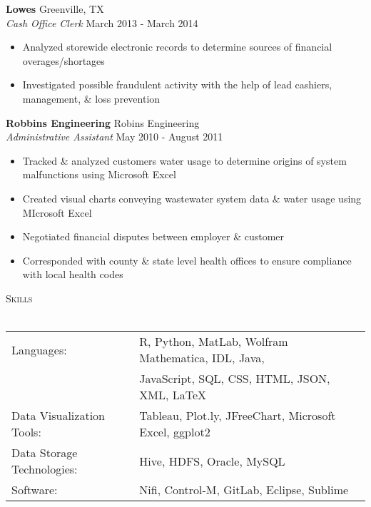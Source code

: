 \documentclass[a4paper]{article}
\newcommand{\lineunder} {
    \vspace*{-8pt} \\
    \hspace*{-18pt} \hrulefill \\
}
\newcommand{\header} [1] {
    {\hspace*{-18pt}\vspace*{6pt} \textsc{#1}}
    \vspace*{-6pt} \lineunder
}
\begin{document}
\newpage
\textbf{Lowe\textquotesingle{}s} \hfill Greenville, TX\\
\textit{Cash Office Clerk} \hfill March 2013 - March 2014\\
\vspace{-1mm}
\begin{itemize} \itemsep 1pt
	\item Analyzed storewide electronic records to determine sources of financial overages/shortages
	\item Investigated possible fraudulent activity with the help of lead cashiers, management, \& loss prevention
\end{itemize}
\textbf{Robbins Engineering} \hfill Robin\textquotesingle{}s Engineering\\
\textit{Administrative Assistant} \hfill May 2010 - August 2011\\
\vspace{-1mm}
\begin{itemize} \itemsep 1pt
	\item Tracked \& analyzed customers\textquotesingle{} water usage to determine origins of system malfunctions using Microsoft Excel
	\item Created visual charts conveying wastewater system data \& water usage using MIcrosoft Excel
	\item Negotiated financial disputes between employer \& customer
	\item Corresponded with county \& state level health offices to ensure compliance with local health codes
\end{itemize}

\header{Skills}
\begin{tabular}{ l l }
	Languages: & R, Python, MatLab, Wolfram Mathematica, IDL, Java, \\
								& JavaScript, SQL, CSS, HTML, JSON, XML, LaTeX \\
	Data Visualization Tools:             & Tableau, Plot.ly, JFreeChart, Microsoft Excel, ggplot2                                        \\
	Data Storage Technologies:            & Hive, HDFS, Oracle, MySQL                                                                     \\
	Software:                             & Nifi, Control-M, GitLab, Eclipse, Sublime                                            \\
\end{tabular}
\vspace{2mm}
\end{document}
